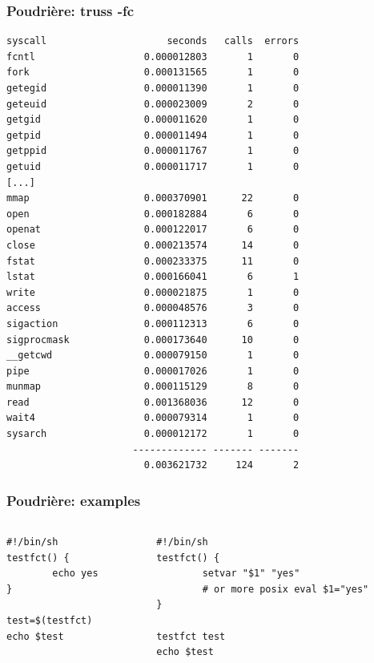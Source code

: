 \begin{frame}[fragile]
	\frametitle{Poudrière: truss -fc}
	\begin{lstlisting}
syscall                     seconds   calls  errors
fcntl                   0.000012803       1       0
fork                    0.000131565       1       0
getegid                 0.000011390       1       0
geteuid                 0.000023009       2       0
getgid                  0.000011620       1       0
getpid                  0.000011494       1       0
getppid                 0.000011767       1       0
getuid                  0.000011717       1       0
[...]
mmap                    0.000370901      22       0
open                    0.000182884       6       0
openat                  0.000122017       6       0
close                   0.000213574      14       0
fstat                   0.000233375      11       0
lstat                   0.000166041       6       1
write                   0.000021875       1       0
access                  0.000048576       3       0
sigaction               0.000112313       6       0
sigprocmask             0.000173640      10       0
__getcwd                0.000079150       1       0
pipe                    0.000017026       1       0
munmap                  0.000115129       8       0
read                    0.001368036      12       0
wait4                   0.000079314       1       0
sysarch                 0.000012172       1       0
                      ------------- ------- -------
                        0.003621732     124       2
\end{lstlisting}
\end{frame}

\begin{frame}[fragile]
	\frametitle{Poudrière: examples}
	\begin{columns}[T]
	\begin{column}{.48\textwidth}
	\begin{lstlisting}
#!/bin/sh
testfct() {
        echo yes
}

test=$(testfct)
echo $test
\end{lstlisting}
	\end{column}
	\begin{column}{.48\textwidth}
	\begin{lstlisting}
#!/bin/sh
testfct() {
        setvar "$1" "yes"
        # or more posix eval $1="yes"
}

testfct test
echo $test
\end{lstlisting}
	\end{column}
	\end{columns}
\end{frame}

